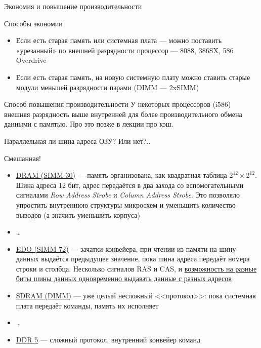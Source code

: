 \documentclass[xetex,aspectratio=43]{beamer}
\begin{document}
\begin{frame}{Экономия и повышение производительности}

    \begin{block}{Способы экономии}
    \begin{itemize}
        \tightlist
        \item
        Если есть старая память или системная плата --- можно поставить
        «урезанный» по внешней разрядности процессор --- 8088, 386SX, 586
        Overdrive
        \item
        Если есть старая память, на новую системную плату можно ставить старые
        модули меньшей разрядности парами (DIMM --- 2xSIMM)
    \end{itemize}
    \end{block}

    \pause

    \begin{block}{Способ повышения производительности}
    У некоторых процессоров (i586) внешняя разрядность выше внутренней
    для более производительного обмена данными с памятью. Про это позже в
    лекции про кэш.
    \end{block}
\end{frame}

\begin{frame}{Параллельная ли шина адреса ОЗУ?}
    Или нет?..
    \pause

    Смешанная!
    \begin{itemize}
        \tightlist
        \item \href{https://en.wikipedia.org/wiki/SIMM\#30-pin_SIMMs}{DRAM (SIMM 30)} --- память организована, как квадратная таблица $2^{12} \times 2^{12}$. Шина адреса 12 бит, адрес передаётся в два захода со вспомогательными сигналами \emph{Row Address Strobe} и \emph{Column Address Strobe}. Это позволяло упростить внутреннюю структуры микросхем и уменьшить количество выводов (а значить уменьшить корпуса)
        \item \ldots
        \item \href{https://en.wikipedia.org/wiki/Dynamic_random-access_memory\#Extended_data_out_DRAM}{EDO (SIMM 72)} --- зачатки конвейера, при чтении из памяти на шину данных выдаётся предыдущее значение, пока шина адреса передаёт номера строки и столбца. Несколько сигналов RAS и CAS, и \href{https://web.archive.org/web/20230312183724/http://programming-lang.com/ru/comp_hard/guk/0/j241.html}{возможность на разные биты шины данных одновременно выдавать данные с разных адресов}
        \item \href{https://en.wikipedia.org/wiki/Synchronous_dynamic_random-access_memory\#Commands}{SDRAM (DIMM)} --- уже целый несложный <<протокол>>: пока системная плата передаёт команды, память их исполняет
        \item \ldots
        \item \href{https://en.wikipedia.org/wiki/DDR5_SDRAM}{DDR 5} --- сложный протокол, внутренний конвейер команд
    \end{itemize}
\end{frame}
\end{document}
